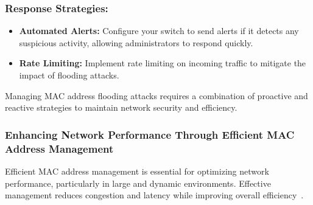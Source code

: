 \documentclass[11pt,a4paper]{article}
\begin{document}
    \subsubsection*{Response Strategies:}

    \begin{itemize}
        \item \textbf{Automated Alerts:} Configure your switch to send alerts if it detects any suspicious activity, allowing administrators to respond quickly.
        \item \textbf{Rate Limiting:} Implement rate limiting on incoming traffic to mitigate the impact of flooding attacks.
    \end{itemize}
    
    Managing MAC address flooding attacks requires a combination of proactive and reactive strategies to maintain network security and efficiency.
    

    \subsubsection*{Enhancing Network Performance Through Efficient MAC Address Management}
    Efficient MAC address management is essential for optimizing network performance, particularly in large and dynamic environments. Effective management reduces congestion and latency while improving overall efficiency~\cite{Network-Efficiency}.
    
\end{document}
